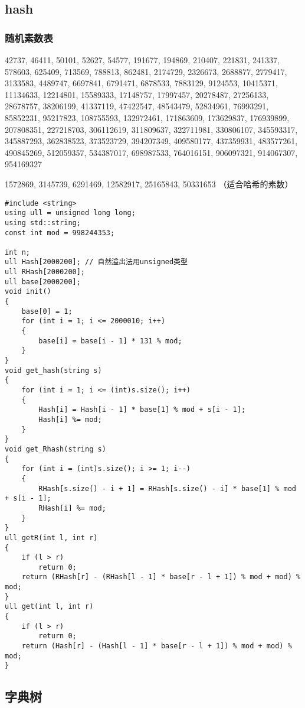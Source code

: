 \documentclass[]{article}
\begin{document}
\hypertarget{hash}{%
\subsection{hash}\label{hash}}

\hypertarget{ux968fux673aux7d20ux6570ux8868}{%
\subsubsection{随机素数表}\label{ux968fux673aux7d20ux6570ux8868}}

42737, 46411, 50101, 52627, 54577, 191677, 194869, 210407, 221831,
241337, 578603, 625409, 713569, 788813, 862481, 2174729, 2326673,
2688877, 2779417, 3133583, 4489747, 6697841, 6791471, 6878533, 7883129,
9124553, 10415371, 11134633, 12214801, 15589333, 17148757, 17997457,
20278487, 27256133, 28678757, 38206199, 41337119, 47422547, 48543479,
52834961, 76993291, 85852231, 95217823, 108755593, 132972461, 171863609,
173629837, 176939899, 207808351, 227218703, 306112619, 311809637,
322711981, 330806107, 345593317, 345887293, 362838523, 373523729,
394207349, 409580177, 437359931, 483577261, 490845269, 512059357,
534387017, 698987533, 764016151, 906097321, 914067307, 954169327

1572869, 3145739, 6291469, 12582917, 25165843, 50331653
（适合哈希的素数）

\begin{verbatim}
#include <string>
using ull = unsigned long long;
using std::string;
const int mod = 998244353;

int n;
ull Hash[2000200]; // 自然溢出法用unsigned类型
ull RHash[2000200];
ull base[2000200];
void init()
{
    base[0] = 1;
    for (int i = 1; i <= 2000010; i++)
    {
        base[i] = base[i - 1] * 131 % mod;
    }
}
void get_hash(string s)
{
    for (int i = 1; i <= (int)s.size(); i++)
    {
        Hash[i] = Hash[i - 1] * base[1] % mod + s[i - 1];
        Hash[i] %= mod;
    }
}
void get_Rhash(string s)
{
    for (int i = (int)s.size(); i >= 1; i--)
    {
        RHash[s.size() - i + 1] = RHash[s.size() - i] * base[1] % mod + s[i - 1];
        RHash[i] %= mod;
    }
}
ull getR(int l, int r)
{
    if (l > r)
        return 0;
    return (RHash[r] - (RHash[l - 1] * base[r - l + 1]) % mod + mod) % mod;
}
ull get(int l, int r)
{
    if (l > r)
        return 0;
    return (Hash[r] - (Hash[l - 1] * base[r - l + 1]) % mod + mod) % mod;
}
\end{verbatim}

\hypertarget{ux5b57ux5178ux6811}{%
\subsection{字典树}\label{ux5b57ux5178ux6811}}
\end{document}
